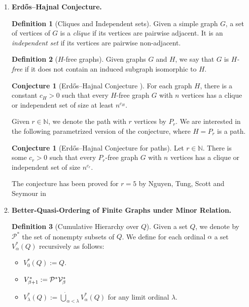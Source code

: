 \documentclass[12pt]{article}
\numberwithin{equation}{section}
\theoremstyle{definition}
\newtheorem{definition}{Definition}
\newtheorem{conjecture}[theorem]{Conjecture}
\begin{document}
\begin{enumerate}
\newpage
\item \textbf{Erdős–Hajnal Conjecture.}


\begin{definition}[Cliques and Independent sets]
Given a simple graph $G$, a set of vertices of $G$ is a \textit{clique} if its vertices are pairwise adjacent. It is an \textit{independent set} if its vertices are pairwise non-adjacent. 
\end{definition}

\begin{definition}[$H$-free graphs]
Given graphs $G$ and $H$, we say that $G$ is \textit{$H$-free} if it does not contain an induced subgraph isomorphic to $H$. 
\end{definition}

\begin{conjecture}[Erdős–Hajnal Conjecture \mbox{\cite{erdos_hajnal}}]
For each graph $H$, there is a constant $c_H > 0$ such that every $H$-free graph $G$ with $n$ vertices has a clique or independent set of size at least $n^{c_H}$. 
\end{conjecture}



Given $r\in \mathbb{N}$, we denote the path with $r$ vertices by $P_r$.
We are interested in the following parametrized version of the conjecture, where $H=P_r$ is a path. 
\begin{conjecture}[Erdős–Hajnal Conjecture for paths]
Let $r\in \mathbb{N}$. There is some $c_r > 0$ such that every $P_r$-free graph $G$ with $n$ vertices has a clique or independent set of size $n^{c_r}$.
\end{conjecture}

The conjecture has been proved for $r=5$ by Nguyen, Tung, Scott and Seymour in \cite{nguyen2026induced}



\newpage
\item \textbf{Better-Quasi-Ordering of Finite Graphs under Minor Relation.}
\begin{definition}[Cumulative Hierarchy over $Q$]
Given a set $Q$, we denote by $\mathcal P^*$ the set of nonempty subsets of $Q$. We define for each ordinal $\alpha$ a set $V^*_{\alpha}(Q)$ recursively as follows:
\begin{itemize}
\item $V^*_0(Q) := Q$.
\item $V^*_{\beta + 1} := \cal{P}^* V^*_{\beta}$
\item $V^*_{\lambda}(Q) := \dot \bigcup_{\alpha < \lambda} V^*_{\alpha}(Q)$ for any limit ordinal $\lambda$.
\end{itemize}


\end{definition}
\end{enumerate}
\end{document}
